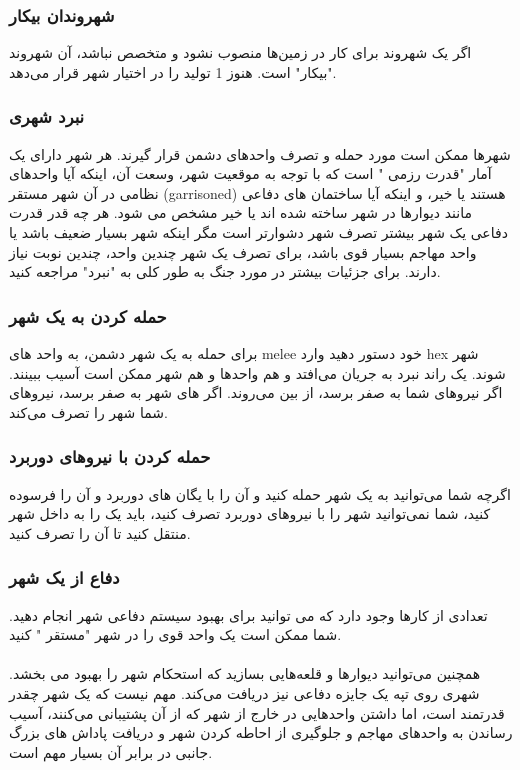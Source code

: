 \documentclass[]{article}
\begin{document}
\subsubsection*{{\titr شهروندان بیکار}}
اگر یک شهروند برای کار در زمین‌­ها منصوب نشود و متخصص نباشد، آن شهروند "بیکار" است. هنوز 1 تولید را در اختیار شهر قرار می‌دهد.

\subsubsection*{{\titr نبرد شهری}}
شهرها ممکن است مورد حمله و تصرف واحدهای دشمن قرار گیرند. هر شهر دارای یک آمار "قدرت رزمی " است که با توجه به موقعیت شهر، وسعت آن، اینکه آیا واحدهای نظامی در آن شهر مستقر (garrisoned) هستند یا خیر، و اینکه آیا ساختمان های دفاعی مانند دیوارها در شهر ساخته شده اند یا خیر مشخص می شود. هر چه قدر قدرت دفاعی یک شهر بیشتر تصرف شهر دشوارتر است مگر اینکه شهر بسیار ضعیف باشد یا واحد مهاجم بسیار قوی باشد، برای تصرف یک شهر چندین واحد، چندین نوبت نیاز دارند. برای جزئیات بیشتر در مورد جنگ به طور کلی به "نبرد" مراجعه کنید.

\subsubsection*{{\titr حمله کردن به یک شهر}}
برای حمله به یک شهر دشمن، به واحد های melee خود دستور دهید وارد hex شهر شوند. یک راند نبرد به جریان می­‌افتد و هم واحد­ها و هم شهر ممکن است آسیب ببینند. اگر  نیرو­های شما به صفر برسد، از بین می‌روند. اگر  های شهر به صفر برسد، نیروهای شما شهر را تصرف می‌کند.

\subsubsection*{{\titr حمله کردن با نیروهای دوربرد}}
اگرچه شما می‌توانید به یک شهر حمله کنید و آن را با یگان های دوربرد و آن را فرسوده کنید، شما نمی‌توانید شهر را با نیروهای دوربرد تصرف کنید، باید یک  را به داخل شهر منتقل کنید تا آن را تصرف کنید.

\subsubsection*{{\titr دفاع از یک شهر}}
تعدادی از کارها وجود دارد که می توانید برای بهبود سیستم دفاعی شهر انجام دهید. شما ممکن است یک واحد قوی را در شهر "مستقر " کنید.\\
\\
همچنین می‌توانید دیوارها و قلعه‌هایی بسازید که استحکام شهر را بهبود می بخشد. شهری روی تپه یک جایزه دفاعی نیز دریافت می‌کند. مهم نیست که یک شهر چقدر قدرتمند است، اما داشتن واحدهایی در خارج از شهر که از آن پشتیبانی می‌کنند، آسیب رساندن به واحدهای مهاجم و جلوگیری از احاطه کردن شهر و دریافت پاداش های بزرگ جانبی در برابر آن بسیار مهم است.\\
\end{document}
